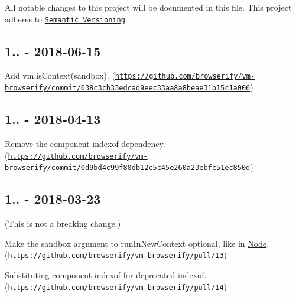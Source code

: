 All notable changes to this project will be documented in this file. This project adheres to \href{http://semver.org/}{\tt Semantic Versioning}.

\subsection*{1.. -\/ 2018-\/06-\/15}


\begin{DoxyItemize}
\item Add {\ttfamily vm.\+is\+Context(sandbox)}. (\href{https://github.com/browserify/vm-browserify/commit/038c3cb33edcad9eec33aa8a8beae31b15c1a006}{\tt https\+://github.\+com/browserify/vm-\/browserify/commit/038c3cb33edcad9eec33aa8a8beae31b15c1a006})
\end{DoxyItemize}

\subsection*{1.. -\/ 2018-\/04-\/13}


\begin{DoxyItemize}
\item Remove the {\ttfamily component-\/indexof} dependency. (\href{https://github.com/browserify/vm-browserify/commit/0d9bd4c99f80db12c5c45e260a23ebfc51ec850d}{\tt https\+://github.\+com/browserify/vm-\/browserify/commit/0d9bd4c99f80db12c5c45e260a23ebfc51ec850d})
\end{DoxyItemize}

\subsection*{1.. -\/ 2018-\/03-\/23}

(This is not a breaking change.)


\begin{DoxyItemize}
\item Make the {\ttfamily sandbox} argument to {\ttfamily run\+In\+New\+Context} optional, like in \mbox{\hyperlink{classNode}{Node}}. (\href{https://github.com/browserify/vm-browserify/pull/13}{\tt https\+://github.\+com/browserify/vm-\/browserify/pull/13})
\item Substituting {\ttfamily component-\/indexof} for deprecated {\ttfamily indexof}. (\href{https://github.com/browserify/vm-browserify/pull/14}{\tt https\+://github.\+com/browserify/vm-\/browserify/pull/14}) 
\end{DoxyItemize}